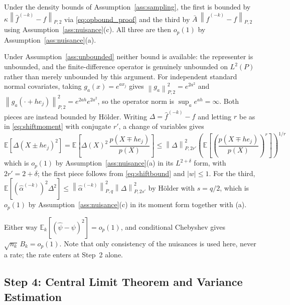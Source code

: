 \documentclass[12pt]{article}
\newcommand{\norm}[1]{\left\| #1 \right\|}
\newcommand{\E}{\mathbb{E}}
\newcommand{\abs}[1]{\left| #1 \right|}
\newcommand{\Ptwo}[1]{\norm{#1}_{P,2}}
\newcommand{\Pq}[2]{\norm{#1}_{P,#2}}
\begin{document}
	Under the density bounds of Assumption~\ref{ass:sampling}, the first is bounded by
	$\kappa \Ptwo{\hat{f}^{(-k)} - f}$ via \eqref{eq:opbound_proof} and the third by
	$\bar{A}\, \Ptwo{\hat{f}^{(-k)} - f}$ using Assumption~\ref{ass:nuisance}(c). All
	three are then $o_p(1)$ by Assumption~\ref{ass:nuisance}(a).

	Under Assumption~\ref{ass:unbounded} neither bound is available: the representer
	is unbounded, and the finite-difference operator is genuinely unbounded on
	$L^2(P)$ rather than merely unbounded by this argument. For independent standard
	normal covariates, taking $g_a(x) = e^{a x_j}$ gives
	$\Ptwo{g_a}^2 = e^{2a^2}$ and $\Ptwo{g_a(\cdot + h e_j)}^2 = e^{2ah}e^{2a^2}$, so
	the operator norm is $\sup_a e^{ah} = \infty$. Both pieces are instead bounded by
	H\"{o}lder. Writing $\Delta = \hat{f}^{(-k)} - f$ and letting $r$ be as in
	\eqref{eq:shiftmoment} with conjugate $r'$, a change of variables gives
	\begin{equation}
		\E\left[\Delta(X \pm h e_j)^2\right]
		= \E\left[\Delta(X)^2\, \frac{p(X \mp h e_j)}{p(X)}\right]
		\leq \Pq{\Delta}{2r'}^2
		\left(\E\left[\left(\frac{p(X \mp h e_j)}{p(X)}\right)^{r}\right]\right)^{1/r}
		\label{eq:shiftbound}
	\end{equation}
	which is $o_p(1)$ by Assumption~\ref{ass:nuisance}(a) in its $L^{2+\delta}$ form,
	with $2r' = 2 + \delta$; the first piece follows from \eqref{eq:shiftbound} and
	$\abs{w} \leq 1$. For the third,
	$\E[(\hat{\alpha}^{(-k)})^2 \Delta^2]
	\leq \Pq{\hat{\alpha}^{(-k)}}{q}^2 \Pq{\Delta}{2s'}^2$ by H\"{o}lder with
	$s = q/2$, which is $o_p(1)$ by Assumption~\ref{ass:nuisance}(c) in its moment
	form together with (a).

	Either way $\E_k[(\hat{\psi} - \psi)^2] = o_p(1)$, and conditional Chebyshev gives
	$\sqrt{n_k}\, B_k = o_p(1)$. Note that only consistency of the nuisances is used
	here, never a rate; the rate enters at Step~2 alone.
	
	\subsection{Step 4: Central Limit Theorem and Variance Estimation}
	
\end{document}
